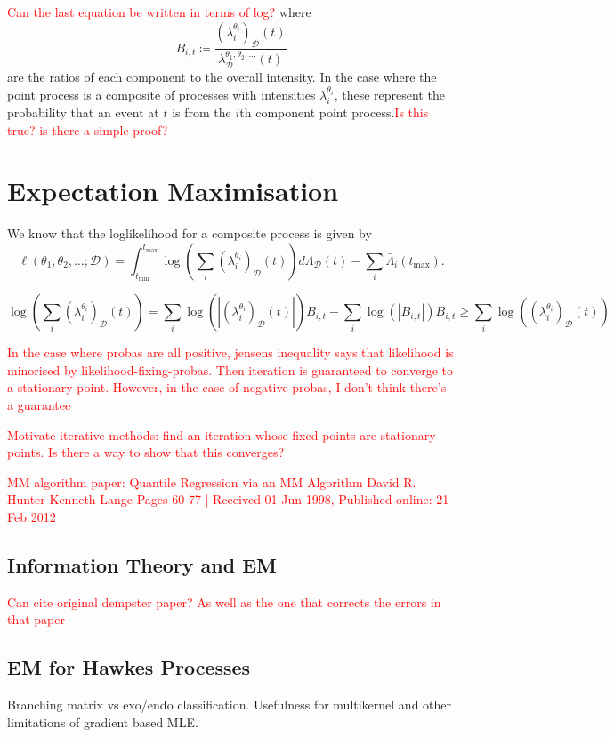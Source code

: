 \documentclass[honours,12pt]{unswthesis}
\numberwithin{equation}{section}
\begin{document}
\textcolor{red}{Can the last equation be written in terms of log?}
where
$$B_{i,t} \coloneq \frac{\left(\lambda_i^{\theta_i}\right)_\mathcal{D}(t)}{\lambda_\mathcal{D}^{\theta_1,\theta_2,\ldots}(t)}$$
are the ratios of each component to the overall intensity. In the case where the point process is a composite of processes with intensities $\lambda_i^{\theta_i}$, these represent the probability that an event at $t$ is from the $i$th component point process.\textcolor{red}{Is this true? is there a simple proof?}

\section{Expectation Maximisation}
We know that the loglikelihood for a composite process is given by
$$\ell(\theta_1,\theta_2,\ldots;\mathcal{D}) = \int_{t_\mathrm{min}}^{t_\mathrm{max}}\log\left(\sum_i \left(\lambda_i^{\theta_i}\right)_{\mathcal{D}}(t)\right)d\Lambda_\mathcal{D}(t)-\sum_i \bar\Lambda_i\left(t_\mathrm{max}\right).$$

$$\log\left(\sum_i \left(\lambda_i^{\theta_i}\right)_{\mathcal{D}}(t)\right) = \sum_i \log\left(\left\vert\left(\lambda_i^{\theta_i}\right)_\mathcal{D}(t)\right\vert\right)B_{i,t} - \sum_i \log\left(\left\vert B_{i,t}\right\vert\right)B_{i,t} \geq \sum_i \log\left(\left(\lambda_i^{\theta_i}\right)_{\mathcal{D}}(t)\right)$$

\textcolor{red}{In the case where probas are all positive, jensens inequality says that likelihood is minorised by likelihood-fixing-probas. Then iteration is guaranteed to converge to a stationary point. However, in the case of negative probas, I don't think there's a guarantee}

\textcolor{red}{Motivate iterative methods: find an iteration whose fixed points are stationary points. Is there a way to show that this converges?}

\textcolor{red}{MM algorithm paper:   Quantile Regression via an MM Algorithm David R. Hunter Kenneth Lange Pages 60-77 | Received 01 Jun 1998, Published online: 21 Feb 2012}

\subsection{Information Theory and EM}
\textcolor{red}{Can cite original dempster paper? As well as the one that corrects the errors in that paper}

\subsection{EM for Hawkes Processes}
Branching matrix vs exo/endo classification. Usefulness for multikernel and other limitations of gradient based MLE.
\end{document}
